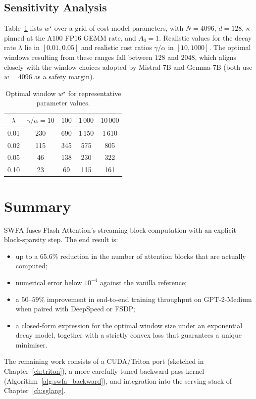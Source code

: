 \subsection{Sensitivity Analysis}\label{sec:swfa_sensitivity}
Table~\ref{tab:swfa_sensitivity} lists $w^\star$ over a grid of
cost-model parameters, with $N = 4096$, $d = 128$, $\kappa$
pinned at the A100 FP16 GEMM rate, and $A_0 = 1$. Realistic
values for the decay rate $\lambda$ lie in $[0.01, 0.05]$ and
realistic cost ratios $\gamma/\alpha$ in $[10, 1000]$. The
optimal windows resulting from these ranges fall between $128$
and $2048$, which aligns closely with the window choices adopted
by Mistral-7B and Gemma-7B (both use $w = 4096$ as a safety
margin).

\begin{table}[h]
\centering
\caption{Optimal window $w^\star$ for representative parameter
         values.}
\label{tab:swfa_sensitivity}
\begin{tabular}{ccccc}
\toprule
$\lambda$ & $\gamma/\alpha = 10$ & $100$ & $1\,000$ & $10\,000$ \\
\midrule
0.01 & 230 & 690  & 1\,150 & 1\,610 \\
0.02 & 115 & 345  &   575  &   805  \\
0.05 &  46 & 138  &   230  &   322  \\
0.10 &  23 &  69  &   115  &   161  \\
\bottomrule
\end{tabular}
\end{table}

\section{Summary}\label{sec:swfa_summary}
SWFA fuses Flash Attention's streaming block computation with an
explicit block-sparsity step. The end result is:
\begin{itemize}
    \item up to a $65.6\%$ reduction in the number of attention
          blocks that are actually computed;
    \item numerical error below $10^{-4}$ against the vanilla
          reference;
    \item a $50$--$59\%$ improvement in end-to-end training
          throughput on GPT-2-Medium when paired with DeepSpeed or
          FSDP;
    \item a closed-form expression for the optimal window size
          under an exponential decay model, together with a
          strictly convex loss that guarantees a unique
          minimiser.
\end{itemize}
The remaining work consists of a CUDA/Triton port (sketched in
Chapter~\ref{ch:triton}), a more carefully tuned
backward-pass kernel (Algorithm~\ref{alg:swfa_backward}), and
integration into the serving stack of Chapter~\ref{ch:sglang}.

